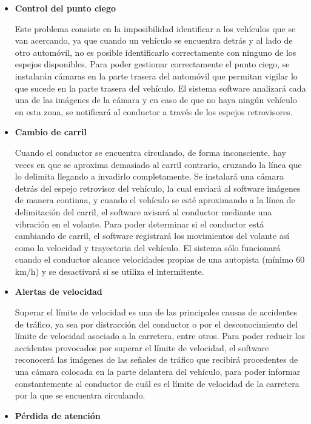 \begin{itemize}[-]
\item \textbf{Control del punto ciego}
\par Este problema consiste en la imposibilidad identificar a los vehículos que se van acercando, ya que cuando un vehículo se encuentra detrás y al lado de otro automóvil, no es posible identificarlo correctamente con ninguno de los espejos disponibles. Para poder gestionar correctamente el punto ciego, se instalarán cámaras en la parte trasera del automóvil que permitan vigilar lo que sucede en la parte trasera del vehículo. El sistema software analizará cada una de las imágenes de la cámara y en caso de que no haya ningún vehículo en esta zona, se notificará al conductor a través de los espejos retrovisores.
\item \textbf{Cambio de carril}
\par Cuando el conductor se encuentra circulando, de forma inconsciente, hay veces en que se aproxima demasiado al carril contrario, cruzando la línea que lo delimita llegando a invadirlo completamente. Se instalará una cámara detrás del espejo retrovisor del vehículo, la cual enviará al software imágenes de manera continua, y cuando el vehículo se esté aproximando a la línea de delimitación del carril, el software avisará al conductor mediante una vibración en el volante. Para poder determinar si el conductor está cambiando de carril, el software registrará los movimientos del volante así como la velocidad y trayectoria del vehículo. El sistema sólo funcionará cuando el conductor alcance velocidades propias de una autopista (mínimo 60 km/h) y se desactivará si se utiliza el intermitente.
\item \textbf{Alertas de velocidad}
\par Superar el límite de velocidad es una de las principales causas de accidentes de tráfico, ya sea por distracción del conductor o por el desconocimiento del límite de velocidad asociado a la carretera, entre otros. Para poder reducir los accidentes provocados por superar el límite de velocidad, el software reconocerá las imágenes de las señales de tráfico que recibirá procedentes de una cámara colocada en la parte delantera del vehículo, para poder informar constantemente al conductor de cuál es el límite de velocidad de la carretera por la que se encuentra circulando.
\item \textbf{Pérdida de atención}

\end{itemize}
